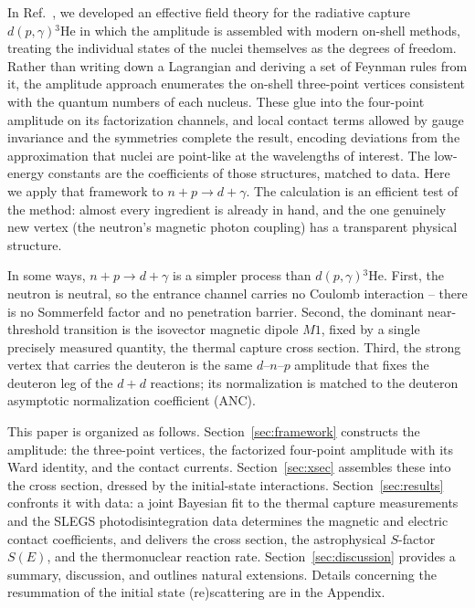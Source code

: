 \documentclass[
  aps,prd,twocolumn,nofootinbib,superscriptaddress,
  longbibliography,floatfix,preprintnumbers
]{revtex4-2}
\newcommand{\npdg}{n+p\to d+\gamma}
\newcommand{\dpHe}{d(p,\gamma){}^{3}\mathrm{He}}
\newcommand{\Mone}{M1}
\begin{document}
In Ref.~\cite{Tait:2026guk}, we developed an effective field theory for the radiative
capture $\dpHe$ in which the amplitude is assembled with modern on-shell
methods, treating the individual states of the nuclei themselves as the degrees of freedom.  Rather than writing down a Lagrangian and deriving a set of Feynman
rules from it, the amplitude approach enumerates the on-shell three-point vertices consistent with the
quantum numbers of each nucleus. These glue into the four-point amplitude on its
factorization channels, and local contact terms allowed by gauge invariance and the
symmetries complete the result, encoding deviations from the approximation that nuclei are point-like at the wavelengths of interest. The low-energy constants are the coefficients of
those structures, matched to data. Here we apply that framework to $\npdg$. The
calculation is an efficient test of the method: almost every ingredient is
already in hand, and the one genuinely new vertex (the neutron's magnetic photon coupling) has a transparent physical structure.

In some ways, $\npdg$ is a simpler process than $\dpHe$. First, the neutron is neutral,
so the entrance channel carries no Coulomb interaction -- there is no Sommerfeld
factor and no penetration barrier.
Second, the dominant near-threshold transition is the isovector magnetic dipole
$\Mone$, fixed by a single precisely measured quantity, the thermal capture cross
section. Third, the strong vertex that carries the deuteron is the same
$d$--$n$--$p$ amplitude that fixes the deuteron leg of the $d+d$ reactions; its
normalization is matched to the deuteron asymptotic normalization coefficient (ANC). 

This paper is organized as follows. Section~\ref{sec:framework} constructs the
amplitude: the three-point vertices, the factorized four-point amplitude with
its Ward identity, and the contact currents. Section~\ref{sec:xsec} assembles
these into the cross section, dressed by the initial-state interactions.
Section~\ref{sec:results} confronts it with data: a joint Bayesian fit to the
thermal capture measurements and the SLEGS photodisintegration data determines
the magnetic and electric contact coefficients, and delivers the cross section, the
astrophysical $S$-factor $S(E)$, and the thermonuclear reaction rate.
Section~\ref{sec:discussion} provides a summary, discussion,
and outlines natural extensions.  Details concerning the resummation of the initial
state (re)scattering are in the Appendix.

\end{document}
